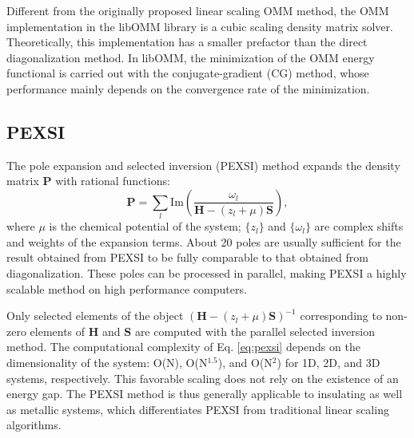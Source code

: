 \documentclass{report}
\begin{document}
Different from the originally proposed linear scaling OMM method, the OMM implementation in the libOMM library \cite{libomm_corsetti_2014} is a cubic scaling density matrix solver.  Theoretically, this implementation has a smaller prefactor than the direct diagonalization method.  In libOMM, the minimization of the OMM energy functional is carried out with the conjugate-gradient (CG) method, whose performance mainly depends on the convergence rate of the minimization.

\subsection{PEXSI}
\label{subsec:solvers_pexsi}
The pole expansion and selected inversion (PEXSI) method \cite{pexsi_lin_2009,pexsi_lin_2013} expands the density matrix $\boldsymbol{P}$ with rational functions:
\begin{equation}
\label{eq:pexsi}
\boldsymbol{P} = \sum_l \text{Im} \left( \frac{\omega_l}{\boldsymbol{H} - (z_l + \mu) \boldsymbol{S}} \right) ,
\end{equation}
where $\mu$ is the chemical potential of the system; $\{z_l\}$ and $\{\omega_l\}$ are complex shifts and weights of the expansion terms.  About 20 poles are usually sufficient for the result obtained from PEXSI to be fully comparable to that obtained from diagonalization.  These poles can be processed in parallel, making PEXSI a highly scalable method on high performance computers.

Only selected elements of the object $(\boldsymbol{H} - (z_l + \mu) \boldsymbol{S})^{-1}$ corresponding to non-zero elements of $\boldsymbol{H}$ and $\boldsymbol{S}$ are computed with the parallel selected inversion method.  The computational complexity of Eq. \ref{eq:pexsi} depends on the dimensionality of the system:  O(N), O(N$^{1.5}$), and O(N$^2$) for 1D, 2D, and 3D systems, respectively.  This favorable scaling does not rely on the existence of an energy gap.  The PEXSI method is thus generally applicable to insulating as well as metallic systems, which differentiates PEXSI from traditional linear scaling algorithms.
\end{document}
